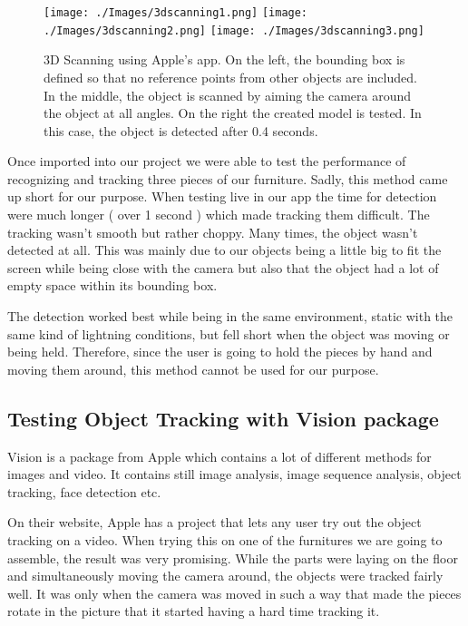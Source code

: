 \begin{figure}[hbtp]
\begin{center}
\texttt{[image: ./Images/3dscanning1.png]}
\texttt{[image: ./Images/3dscanning2.png]}
\texttt{[image: ./Images/3dscanning3.png]} 
\caption{3D Scanning using Apple's app. On the left, the bounding box is defined so that no reference points from other objects are included. In the middle, the object is scanned by aiming the camera around the object at all angles. On the right the created model is tested. In this case, the object is detected after 0.4 seconds.}
\end{center}
\end{figure}

Once imported into our project we were able to test the performance of recognizing and tracking three pieces of our furniture.
Sadly, this method came up short for our purpose. When testing live in our app the time for detection were much longer ( over 1 second ) which made tracking them difficult. The tracking wasn't smooth but rather choppy. Many times, the object wasn't detected at all. This was mainly due to our objects being a little big to fit the screen while being close with the camera but also that the object had a lot of empty space within its bounding box.

The detection worked best while being in the same environment, static with the same kind of lightning conditions, but fell short when the object was moving or being held. Therefore, since the user is going to hold the pieces by hand and moving them around, this method cannot be used for our purpose.

\subsection{Testing Object Tracking with Vision package}
Vision is a package from Apple which contains a lot of different methods for images and video. It contains still image analysis, image sequence analysis, object tracking, face detection etc.

On their website, Apple has a project that lets any user try out the object tracking on a video. When trying this on one of the furnitures we are going to assemble, the result was very promising. While the parts were laying on the floor and simultaneously moving the camera around, the objects were tracked fairly well. It was only when the camera was moved in such a way that made the pieces rotate in the picture that it started having a hard time tracking it.

